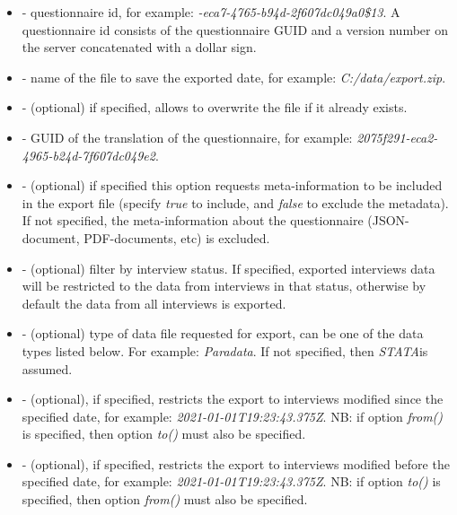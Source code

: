 \optsheader
\begin{itemize}
\item {} - questionnaire id, for example: \textit{-eca7-4765-b94d-2f607dc049a0\$13\textquotedbl}. A questionnaire id consists of the questionnaire GUID and a version number on the server concatenated with a dollar sign.
\item {} - name of the file to save the exported date, for example: \textit{\textquotedbl C:/data/export.zip\textquotedbl}.
\item {} - (optional) if specified, allows to overwrite the file if it already exists.
\item {} - GUID of the translation of the questionnaire, for example: \textit{\textquotedbl 2075f291-eca2-4965-b24d-7f607dc049e2\textquotedbl}.
\item {} - (optional) if specified this option requests meta-information to be included in the export file (specify \textit{\textquotedbl true\textquotedbl} to include, and \textit{\textquotedbl false\textquotedbl} to exclude the metadata). If not specified, the meta-information about the questionnaire (JSON-document, PDF-documents, etc) is excluded.
\item {} - (optional) filter by interview status. If specified, exported interviews data will be restricted to the data from interviews in that status, otherwise by default the data from all interviews is exported.
\item {} - (optional) type of data file requested for export, can be one of the data types listed below. For example: \textquotedbl \textit{Paradata}\textquotedbl. If not specified, then \textquotedbl\textit{STATA}\textquotedbl  is assumed.
\item {} - (optional), if specified, restricts the export to interviews modified since the specified date, for example: \textquotedbl \textit{2021-01-01T19:23:43.375Z}\textquotedbl. NB: if option \textit{from()} is specified, then option \textit{to()} must also be specified.
\item {} - (optional), if specified, restricts the export to interviews modified before the specified date, for example: \textquotedbl\textit{2021-01-01T19:23:43.375Z}\textquotedbl. NB: if option \textit{to()} is specified, then option \textit{from()} must also be specified.
\end{itemize}

